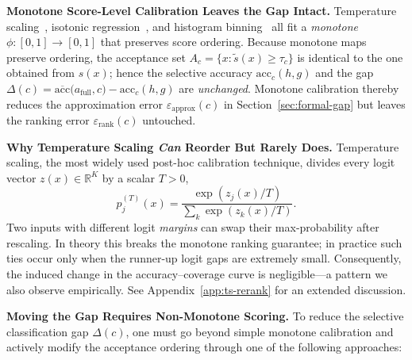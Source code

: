 \textbf{Monotone Score-Level Calibration Leaves the Gap Intact.}
Temperature scaling~\citep{guo2017calibration}, isotonic regression~\citep{zadrozny2002transforming}, and histogram
binning~\citep{zadrozny2001obtaining} all fit a \emph{monotone} \(\phi\colon[0,1]\to[0,1]\) that preserves score ordering.
Because monotone maps preserve ordering,
the acceptance set
\(A_c=\{x:\tilde s(x)\ge\tau_c\}\)
is identical to the one obtained from \(s(x)\);
hence the selective accuracy
\(\mathrm{acc}_c(h,g)\)
and the gap
\(
\Delta(c)=\overline{\mathrm{acc}}\bigl(a_{\text{full}},c\bigr)-\mathrm{acc}_c(h,g)
\)
are \emph{unchanged}.
Monotone calibration thereby reduces the approximation error \(\varepsilon_{\text{approx}}(c)\) in Section~\ref{sec:formal-gap} but leaves the ranking error \(\varepsilon_{\text{rank}}(c)\) untouched.

\textbf{Why Temperature Scaling \texorpdfstring{\emph{Can}}{} Reorder But Rarely Does.}
Temperature scaling, the most widely used post-hoc calibration technique, divides every logit vector
\(z(x)\in\mathbb{R}^K\) by a scalar \(T>0\),
\begin{equation}
p_j^{(T)}(x)=
\frac{\exp(z_j(x)/T)}{\sum_k \exp(z_k(x)/T)}.
\end{equation}
Two inputs with different logit \emph{margins} can swap their
max-probability after rescaling. In theory this breaks the monotone
ranking guarantee; in practice such ties occur only when the runner-up logit gaps are extremely small. Consequently, the induced change in the
accuracy–coverage curve is negligible—a pattern we also observe empirically. See Appendix~\ref{app:ts-rerank} for an extended discussion.

\textbf{Moving the Gap Requires Non-Monotone Scoring.}
To reduce the selective classification gap \(\Delta(c)\), one must go beyond simple monotone calibration and actively modify the acceptance ordering through one of the following approaches:

